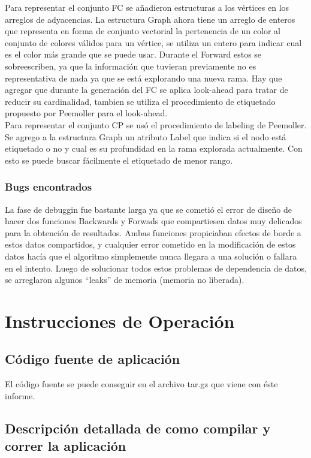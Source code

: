 \documentclass[a4paper,10pt]{article}
\begin{document}
\indent Para representar el conjunto FC se a\~nadieron estructuras a los
v\'ertices en los arreglos de adyacencias. La estructura Graph ahora
tiene un arreglo de enteros que representa en forma de conjunto
vectorial la pertenencia de un color al conjunto de colores v\'alidos
para un v\'ertice, se utiliza un entero para indicar cual es el color
m\'as grande que se puede usar. Durante el Forward estos se sobreescriben, ya que la
informaci\'on que tuvieran previamente no es representativa de nada ya
que se est\'a explorando una nueva rama. Hay que agregar que durante la
generaci\'on del FC se aplica look-ahead para tratar de reducir su
cardinalidad, tambien se utiliza el procedimiento de etiquetado
propuesto por Peemoller para el look-ahead.\\

\indent Para representar el conjunto CP se us\'o el procedimiento de labeling de
Peemoller. Se agrego a la estructura Graph un atributo Label que indica
si el nodo est\'a etiquetado o no y cual es su profundidad en la rama
explorada actualmente. Con esto se puede buscar f\'acilmente el
etiquetado de menor rango.

\subsubsection{Bugs encontrados}
La fase de debuggin fue bastante larga ya que se cometió el error de diseño 
de hacer dos funciones Backwards y Forwads que compartiesen datos muy delicados 
para la obtención de resultados. Ambas funciones propiciaban efectos de borde a estos 
datos compartidos, y cualquier error cometido en la modificación de estos datos hacía 
que el algoritmo simplemente nunca llegara a una solución o fallara en el intento. 
Luego de solucionar todos estos problemas de dependencia de datos, se arreglaron 
algunos ``leaks'' de memoria (memoria no liberada). 
\newpage

\section{Instrucciones de Operación}

\subsection{Código fuente de aplicación}
El código fuente se puede conseguir en el archivo tar.gz que viene con
éste informe.

\subsection{Descripción detallada de como compilar y correr la aplicación}
\end{document}
